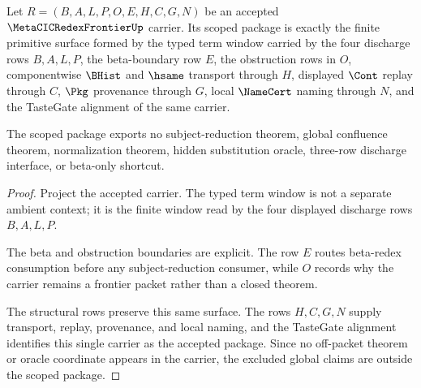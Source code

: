 \begin{theorem}
\label{thm:metacic-redex-frontier-scope-package}
Let $R=(B,A,L,P,O,E,H,C,G,N)$ be an accepted $\MetaCICRedexFrontierUp$ carrier. Its scoped package is exactly the finite primitive surface formed by the typed term window carried by the four discharge rows $B,A,L,P$, the beta-boundary row $E$, the obstruction rows in $O$, componentwise $\BHist$ and $\hsame$ transport through $H$, displayed $\Cont$ replay through $C$, $\Pkg$ provenance through $G$, local $\NameCert$ naming through $N$, and the TasteGate alignment of the same carrier.

The scoped package exports no subject-reduction theorem, global confluence theorem, normalization theorem, hidden substitution oracle, three-row discharge interface, or beta-only shortcut.
\end{theorem}
\begin{proof}
Project the accepted carrier. The typed term window is not a separate ambient context; it is the finite window read by the four displayed discharge rows $B,A,L,P$.

The beta and obstruction boundaries are explicit. The row $E$ routes beta-redex consumption before any subject-reduction consumer, while $O$ records why the carrier remains a frontier packet rather than a closed theorem.

The structural rows preserve this same surface. The rows $H,C,G,N$ supply transport, replay, provenance, and local naming, and the TasteGate alignment identifies this single carrier as the accepted package. Since no off-packet theorem or oracle coordinate appears in the carrier, the excluded global claims are outside the scoped package.
\end{proof}

